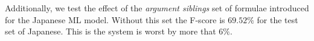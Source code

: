 Additionally, we test the effect of the \emph{argument siblings} set of formulae 
introduced for the Japanese ML model. Without this set the F-score is $69.52\%$ 
for the test set of Japanese. This is the system is worst by more that $6\%$.







